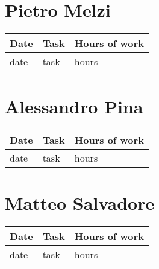 \section{Pietro Melzi}
\begin{table}[H]
	\begin{tabular}{ p{2cm} p{10cm} p{3cm}}
	Date & Task & Hours of work\\
	\hline
	date & task & hours \\
	
	\end{tabular}
\end{table}

\section{Alessandro Pina}
\begin{table}[H]
	\begin{tabular}{ p{2cm} p{10cm} p{3cm}}
	Date & Task & Hours of work\\
	\hline
	date & task & hours \\
	\end{tabular}
\end{table}

\section{Matteo Salvadore}
\begin{table}[H]
	\begin{tabular}{ p{2cm} p{10cm} p{3cm}}
	Date & Task & Hours of work\\
	\hline
	date & task & hours \\
	\end{tabular}
\end{table}